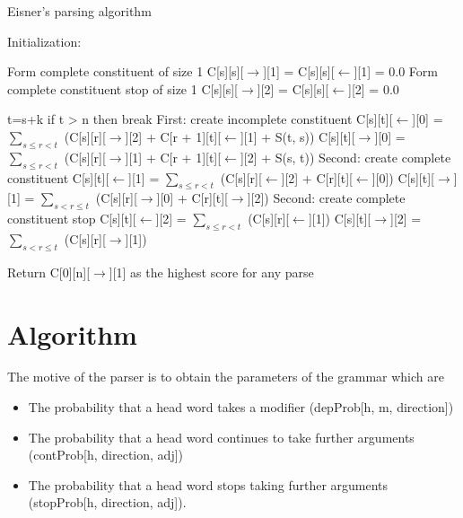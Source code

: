 \documentclass{article}
\begin{document}
\begin{algorithm}

\caption{Eisner's parsing algorithm}
  \label{Figure 1}

\begin{algorithmic}

  \State Initialization:

        Form complete constituent of size 1
        \State C[s][s][$\rightarrow$][1] = C[s][s][$\leftarrow$][1] = 0.0
        Form complete constituent stop of size 1
        \State C[s][s][$\rightarrow$][2] = C[s][s][$\leftarrow$][2] = 0.0
\EndFor




    \State t=s+k
     \State if t > n then break
     \State First: create incomplete constituent
      \State C[s][t][$\leftarrow$][0] = $\sum_{s \le r< t}$ (C[s][r][$\rightarrow$][2] + C[r + 1][t][$\leftarrow$][1] + S(t, s)) 
      \State C[s][t][$\rightarrow$][0] = $\sum_{s \le r<t}$ (C[s][r][$\rightarrow$][1] + C[r + 1][t][$\leftarrow$][2] + S(s, t)) 
      \State Second: create complete constituent
      \State C[s][t][$\leftarrow$][1] = $\sum_{s \le r<t}$ (C[s][r][$\leftarrow$][2] + C[r][t][$\leftarrow$][0])
      \State C[s][t][$\rightarrow$][1] = $\sum_{s<r \le t}$ (C[s][r][$\rightarrow$][0] + C[r][t][$\rightarrow$][2])
      \State Second: create complete constituent stop
      \State C[s][t][$\leftarrow$][2] = $\sum_{s \le r<t}$ (C[s][r][$\leftarrow$][1])
      \State C[s][t][$\rightarrow$][2] = $\sum_{s<r \le t}$ (C[s][r][$\rightarrow$][1])


\EndFor
\EndFor

      \State Return C[0][n][$\rightarrow$][1] as the highest score for any parse

\end{algorithmic}
\end{algorithm}



\section{Algorithm}

The motive of the parser is to obtain the parameters of the grammar which are 

\begin{itemize}
\item The probability that a head word takes a modifier (depProb[h, m, direction])
\item The probability that a head word continues to take further arguments (contProb[h, direction, adj])
\item The probability that a head word stops taking further arguments (stopProb[h, direction, adj]). 
\end{itemize}
\end{document}
